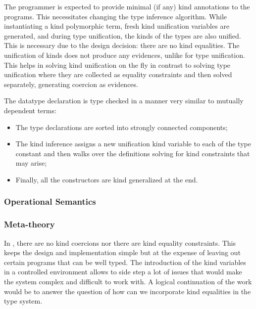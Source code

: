 \documentclass[screen,nonacm,manuscript,review]{acmart} %
\begin{document}
The programmer is expected to provide minimal (if any) kind annotations to the programs. This necessitates changing the type inference algorithm. While instantiating a kind polymorphic term, fresh kind unification variables are generated, and during type unification, the kinds of the types are also unified. This is necessary due to the design decision: there are no kind equalities. The unification of kinds does not produce any evidences, unlike for type unification. This helps in solving kind unification on the fly in contrast to solving type unification where they are collected as equality constraints and then solved separately, generating coercion as evidences.


The datatype declaration is type checked in a manner very similar to mutually dependent terms:
\begin{itemize}
\item The type declarations are sorted into strongly connected components;
\item The kind inference assigns a new unification kind variable to each of the type constant and then walks over the definitions solving for kind constraints that may arise;
\item Finally, all the constructors are kind generalized at the end.
\end{itemize}

\subsubsection{Operational Semantics}\label{sec:sfp-opsem}

\subsubsection{Meta-theory}\label{sec:sfp-metatheory}

In \SFP, there are no kind coercions nor there are kind equality
constraints. This keeps the design and implementation simple but at
the expense of leaving out certain programs that can be well
typed. The introduction of the kind variables in a controlled environment allows to
side step a lot of issues that would make the system complex and difficult to work with.
A logical continuation of the work would be to answer the
question of how can we incorporate kind equalities in the type system.
\end{document}
